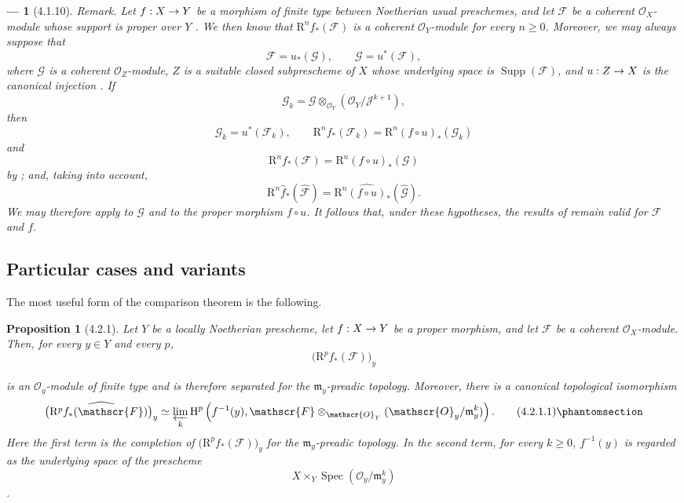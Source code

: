 \documentclass[oneside]{amsart}
\theoremstyle{ega-env-style}
\newtheorem*{env}{---}
\theoremstyle{ega-thm-env-style}
\newtheorem*{proposition}{Proposition}
\theoremstyle{ega-defn-env-style}
\def\mathcal{\mathscr}
\def\sh{\mathcal}                   %
\def\geq{\geqslant}                 %
\def\HH{\mathrm{H}}                 %
\def\RR{\mathrm{R}}                 %
\def\Supp{\operatorname{Supp}}
\def\Spec{\operatorname{Spec}}
\renewcommand{\to}{\mathchoice{\longrightarrow}{\rightarrow}{\rightarrow}{\rightarrow}}
\def\isoto{\simeq} %
\newcommand{\oldpage}[2][]{{\marginnote{\normalfont{\textbf{#1}~|~#2}}}\ignorespaces}
\let\EGAOriginalLabel\label
\renewcommand{\label}[1]{\phantomsection\EGAOriginalLabel{#1}}
\begin{document}
\begin{env}[4.1.10]
\label{III.4.1.10}
\emph{Remark.}
Let $f:X\to Y$ be a morphism of finite type between Noetherian usual
preschemes, and let $\sh{F}$ be a coherent $\sh{O}_X$-module whose
support is proper over $Y$ .
We then know  that $\RR^n f_*(\sh{F})$ is a coherent
$\sh{O}_Y$-module for every $n\geq0$.
Moreover, we may always suppose that
\[
  \sh{F}=u_*(\sh{G}),
  \qquad
  \sh{G}=u^*(\sh{F}),
\]
where $\sh{G}$ is a coherent $\sh{O}_Z$-module, $Z$ is a suitable
closed subprescheme of $X$ whose underlying space is
$\Supp(\sh{F})$, and $u:Z\to X$ is the canonical injection
.
If
\[
  \sh{G}_k
  =
  \sh{G}\otimes_{\sh{O}_Y}
  (\sh{O}_Y/\sh{J}^{k+1}),
\]
then
\[
  \sh{G}_k=u^*(\sh{F}_k),
  \qquad
  \RR^n f_*(\sh{F}_k)
  =
  \RR^n(f\circ u)_*(\sh{G}_k)
\]
and
\[
  \RR^n f_*(\sh{F})
  =
  \RR^n(f\circ u)_*(\sh{G})
\]
by ; and, taking  into account,
\[
  \RR^n\widehat{f}_*(\widehat{\sh{F}})
  =
  \RR^n\widehat{(f\circ u)}_*(\widehat{\sh{G}}).
\]
We may therefore apply  to $\sh{G}$ and to the proper
morphism $f\circ u$.
It follows that, under these hypotheses, the results of
 remain valid for $\sh{F}$ and $f$.
\end{env}


\subsection{Particular cases and variants}
\label{subsection:III.4.2}

The most useful form of the comparison theorem  is
the following.

\begin{proposition}[4.2.1]
\label{III.4.2.1}
Let $Y$ be a locally Noetherian prescheme, let $f:X\to Y$ be a
proper morphism, and let $\sh{F}$ be a coherent $\sh{O}_X$-module.
Then, for every $y\in Y$ and every $p$,
\[
  \bigl(\RR^p f_*(\sh{F})\bigr)_y
\]

\oldpage[III]{130}

is an $\sh{O}_y$-module of finite type and is therefore separated
for the $\mathfrak{m}_y$-preadic topology.
Moreover, there is a canonical topological isomorphism
\[
  \widehat{\bigl(\RR^p f_*(\sh{F})\bigr)_y}
  \isoto
  \varprojlim_k
  \HH^p\left(
    f^{-1}(y),
    \sh{F}\otimes_{\sh{O}_Y}
    (\sh{O}_y/\mathfrak{m}_y^k)
  \right).
  \tag{4.2.1.1}
  \label{III.4.2.1.1}
\]
Here the first term is the completion of
$\bigl(\RR^p f_*(\sh{F})\bigr)_y$ for the
$\mathfrak{m}_y$-preadic topology.
In the second term, for every $k\geq0$, $f^{-1}(y)$ is regarded as
the underlying space of the prescheme
\[
  X\times_Y\Spec(\sh{O}_y/\mathfrak{m}_y^k)
\]
.
\end{proposition}
\end{document}
